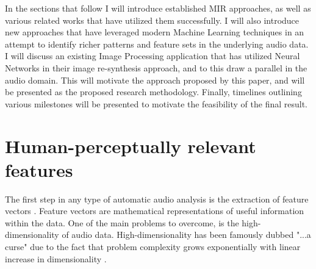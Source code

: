\documentclass[12pt]{article}
\begin{document}
In the sections that follow I will introduce established MIR approaches, as well as various related works that have utilized them successfully. I will also introduce new approaches that have leveraged modern Machine Learning techniques in an attempt to identify richer patterns and feature sets in the underlying audio data. I will discuss an existing Image Processing application that has utilized Neural Networks in their image re-synthesis approach, and to this draw a parallel in the audio domain. This will motivate the approach proposed by this paper, and will be presented as the proposed research methodology. Finally, timelines outlining various milestones will be presented to motivate the feasibility of the final result.

\section{Human-perceptually relevant features}
The first step in any type of automatic audio analysis is the extraction of feature vectors \citep{Tzanetakis02}. Feature vectors are mathematical representations of useful information within the data. One of the main problems to overcome, is the high-dimensionality of audio data. High-dimensionality has been famously dubbed "...a curse" \citep{Bellman57} due to the fact that problem complexity grows exponentially with linear increase in dimensionality \citep{DeepLearningSurvey2010}.
\end{document}
